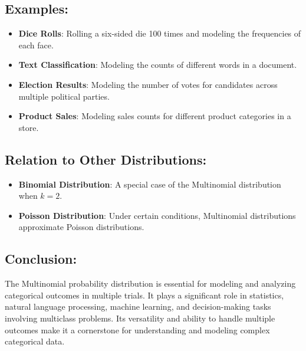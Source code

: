 \subsection*{Examples:}
\begin{itemize}
    \item \textbf{Dice Rolls}: Rolling a six-sided die 100 times and modeling the frequencies of each face.
    \item \textbf{Text Classification}: Modeling the counts of different words in a document.
    \item \textbf{Election Results}: Modeling the number of votes for candidates across multiple political parties.
    \item \textbf{Product Sales}: Modeling sales counts for different product categories in a store.
\end{itemize}

\subsection*{Relation to Other Distributions:}
\begin{itemize}
    \item \textbf{Binomial Distribution}: A special case of the Multinomial distribution when $k = 2$.
    \item \textbf{Poisson Distribution}: Under certain conditions, Multinomial distributions approximate Poisson distributions.
\end{itemize}

\subsection*{Conclusion:}
The Multinomial probability distribution is essential for modeling and analyzing categorical outcomes in multiple trials. It plays a significant role in statistics, natural language processing, machine learning, and decision-making tasks involving multiclass problems. Its versatility and ability to handle multiple outcomes make it a cornerstone for understanding and modeling complex categorical data.
